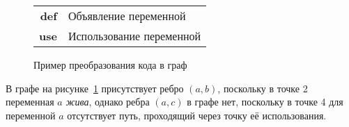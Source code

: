 \begin{example}
    \begin{figure}[h]
        \centering
    \caption{Пример преобразования кода в граф}
    \begin{tabular}{r @{: } l}
        \textbf{def} & Объявление переменной \\
        \textbf{use} & Использование переменной \\
    \end{tabular}
    \label{fig:ex1}
    \end{figure}

        


В графе на рисунке~\ref{fig:ex1} присутствует ребро $(a, b)$, поскольку в точке 2 переменная $a$ \textit{жива}, однако ребра $(a, c)$ в графе нет,
поскольку в точке 4 для переменной $a$ отсутствует путь, проходящий через точку её использования.
    
\end{example}

